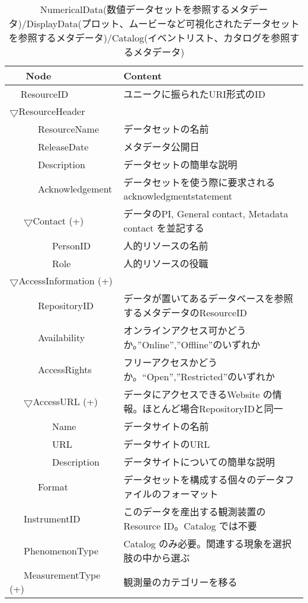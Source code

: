\begin{table}[ht]
\begin{center}
{\scriptsize
\caption{NumericalData(数値データセットを参照するメタデータ)/DisplayData(プロット、ムービーなど可視化されたデータセットを参照するメタデータ)/Catalog(イベントリスト、カタログを参照するメタデータ)}
\begin{tabular}{ll}\hline
\ \ \ Node & Content \\ \hline
\ \ \,ResourceID & ユニークに振られたURI形式のID\\
$\bigtriangledown$ResourceHeader & \\
\ \ \ \ \ \ ResourceName & データセットの名前\\
\ \ \ \ \ \ ReleaseDate & メタデータ公開日\\
\ \ \ \ \ \ Description & データセットの簡単な説明\\
\ \ \ \ \ \ Acknowledgement & データセットを使う際に要求されるacknowledgmentstatement\\
\ \ \ $\bigtriangledown$Contact (+) & データのPI, General contact, Metadata contact を並記する\\
\ \ \ \ \ \ \ \ \ PersonID & 人的リソースの名前\\
\ \ \ \ \ \ \ \ \ Role & 人的リソースの役職\\
$\bigtriangledown$AccessInformation (+) & \\
\ \ \ \ \ \ RepositoryID & データが置いてあるデータベースを参照するメタデータのResourceID\\
\ \ \ \ \ \ Availability & オンラインアクセス可かどうか。”Online”,”Offline”のいずれか\\
\ \ \ \ \ \ AccessRights & フリーアクセスかどうか。“Open”,”Restricted”のいずれか\\
\ \ \ $\bigtriangledown$AccessURL (+) &データにアクセスできるWebsite の情報。ほとんど場合RepositoryIDと同一\\
\ \ \ \ \ \ \ \ \ Name & データサイトの名前\\
\ \ \ \ \ \ \ \ \ URL & データサイトのURL\\
\ \ \ \ \ \ \ \ \ Description & データサイトについての簡単な説明\\
\ \ \ \ \ \ Format & データセットを構成する個々のデータファイルのフォーマット\\
\ \ \ InstrumentID & このデータを産出する観測装置のResource ID。Catalog では不要\\
\ \ \ PhenomenonType & Catalog のみ必要。関連する現象を選択肢の中から選ぶ\\
\ \ \ MeasurementType (+) & 観測量のカテゴリーを移る\\

\end{tabular}}
\end{center}
\end{table}
